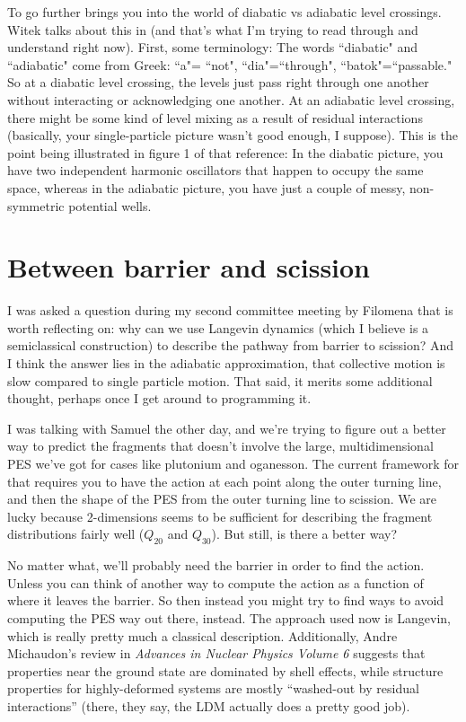To go further brings you into the world of diabatic vs adiabatic level crossings. Witek talks about this in \cite{Nazarewicz1993} (and that's what I'm trying to read through and understand right now). First, some terminology: The words ``diabatic" and ``adiabatic" come from Greek: ``a"= ``not", ``dia"=``through", ``batok"=``passable." So at a diabatic level crossing, the levels just pass right through one another without interacting or acknowledging one another. At an adiabatic level crossing, there might be some kind of level mixing as a result of residual interactions (basically, your single-particle picture wasn't good enough, I suppose). This is the point being illustrated in figure 1 of that reference: In the diabatic picture, you have two independent harmonic oscillators that happen to occupy the same space, whereas in the adiabatic picture, you have just a couple of messy, non-symmetric potential wells.

\section{Between barrier and scission}

I was asked a question during my second committee meeting by Filomena that is worth reflecting on: why can we use Langevin dynamics (which I believe is a semiclassical construction) to describe the pathway from barrier to scission? And I think the answer lies in the adiabatic approximation, that collective motion is slow compared to single particle motion. That said, it merits some additional thought, perhaps once I get around to programming it.

I was talking with Samuel the other day, and we're trying to figure out a better way to predict the fragments that doesn't involve the large, multidimensional PES we've got for cases like plutonium and oganesson. The current framework for that requires you to have the action at each point along the outer turning line, and then the shape of the PES from the outer turning line to scission. We are lucky because 2-dimensions seems to be sufficient for describing the fragment distributions fairly well ($Q_{20}$ and $Q_{30}$). But still, is there a better way?

No matter what, we'll probably need the barrier in order to find the action. Unless you can think of another way to compute the action as a function of where it leaves the barrier. So then instead you might try to find ways to avoid computing the PES way out there, instead. The approach used now is Langevin, which is really pretty much a classical description. Additionally, Andre Michaudon's review in \textit{Advances in Nuclear Physics Volume 6} suggests that properties near the ground state are dominated by shell effects, while structure properties for highly-deformed systems are mostly ``washed-out by residual interactions'' (there, they say, the LDM actually does a pretty good job).

